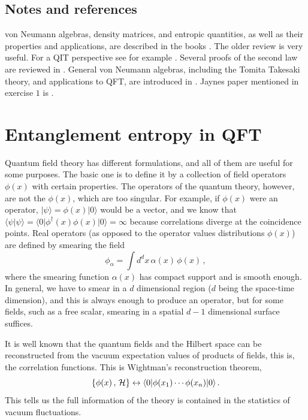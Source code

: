\documentclass[12pt]{article}
\numberwithin{equation}{section}
\newcommand{\be}{\begin{equation}}
\newcommand{\ee}{\end{equation}}
\begin{document}
\subsection{Notes and references}
 von Neumann algebras, density matrices, and entropic quantities, as well as their properties and applications, are described in the books \cite{ohya2004quantum,petz2007quantum}. The older review \cite{wehrl1978general} is very useful. For a QIT perspective see for example \cite{nielsen2002quantum,vedral}. Several proofs of the second law are reviewed in \cite{sagawa2013second}. General von Neumann algebras, including the Tomita Takesaki theory, and applications to QFT, are introduced in \cite{Haag:1992hx}. Jaynes paper mentioned in exercise $1$ is \cite{jaynes1957information}.

\newpage
 
\section{Entanglement entropy in QFT}
\label{EEQFT}

Quantum field theory has different formulations, and all of them are useful for some purposes. The basic one is to define it by a collection of field operators $\phi(x)$ with certain properties.  The operators of the quantum theory, however, are not the $\phi(x)$, which are too singular. For example, if $\phi(x)$ were an operator, $|\psi\rangle=\phi(x)|0\rangle$ would be a vector, and we know that $\langle \psi|\psi \rangle= \langle 0|\phi^\dagger(x)\phi(x)|0\rangle=\infty$ because correlations diverge at the coincidence points. Real operators (as opposed to the operator values distributions $\phi(x)$) are defined by smearing the field 
\be
\phi_\alpha=\int d^dx\, \alpha(x)\, \phi(x)\,,
\ee
where the smearing function $\alpha(x)$ has compact support and is smooth enough. In general, we have to smear in a $d$ dimensional region ($d$ being the space-time dimension), and this is always enough to produce an operator, but for some fields, such as a free scalar, smearing in a spatial $d-1$ dimensional surface suffices.

It is well known that the quantum fields and the Hilbert space can be reconstructed from the vacuum expectation values of products of fields, this is, the correlation functions. This is Wightman's reconstruction theorem,  
\be
\{\phi(x)\,, \, {\cal H}\} \leftrightarrow \langle 0| \phi(x_1)\cdots \phi(x_n)|0\rangle\,.  \label{recon}
\ee
This tells us the full information of the theory is contained in the statistics of vacuum fluctuations. 
\end{document}
